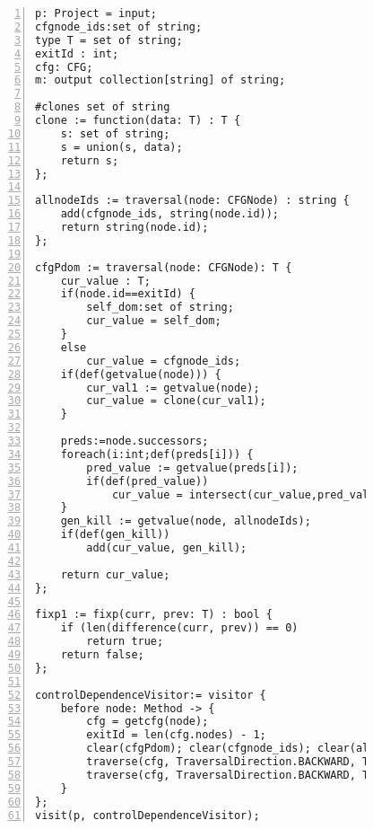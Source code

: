 \begin{figure}
\begin{lstlisting}[numbers=left, tabsize=4, escapechar=@, caption={Code to compute post dominator using Boa language.},label={lst:puttingTogether}] 
p: Project = input;
cfgnode_ids:set of string;                     
type T = set of string; 
exitId : int;
cfg: CFG;  
m: output collection[string] of string;

#clones set of string
clone := function(data: T) : T {
	s: set of string;
	s = union(s, data);
	return s;
};

allnodeIds := traversal(node: CFGNode) : string {
	add(cfgnode_ids, string(node.id));
	return string(node.id);
};

cfgPdom := traversal(node: CFGNode): T {
	cur_value : T;
	if(node.id==exitId) {
		self_dom:set of string;
		cur_value = self_dom;
	}
	else
		cur_value = cfgnode_ids;
	if(def(getvalue(node))) {
		cur_val1 := getvalue(node);
		cur_value = clone(cur_val1);
	}

	preds:=node.successors;
	foreach(i:int;def(preds[i])) {
		pred_value := getvalue(preds[i]);
		if(def(pred_value))
			cur_value = intersect(cur_value,pred_value);
	}	
	gen_kill := getvalue(node, allnodeIds);
	if(def(gen_kill))
        add(cur_value, gen_kill);
		
	return cur_value;
};

fixp1 := fixp(curr, prev: T) : bool {
 	if (len(difference(curr, prev)) == 0)
 		return true;	
 	return false;
};

controlDependenceVisitor:= visitor {
	before node: Method -> {
		cfg = getcfg(node);
		exitId = len(cfg.nodes) - 1;
		clear(cfgPdom);	clear(cfgnode_ids); clear(allnodeIds);
		traverse(cfg, TraversalDirection.BACKWARD, TraversalKind.Hybrid, allnodeIds);
		traverse(cfg, TraversalDirection.BACKWARD, TraversalKind.Hybrid, cfgPdom, fixp1);		    
	}
};
visit(p, controlDependenceVisitor);
\end{lstlisting}
\end{figure}